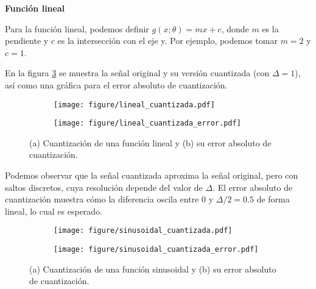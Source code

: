 \documentclass[paper=letter, fontsize=11pt, draft=false]{scrartcl}
\numberwithin{equation}{problemcounter} %
\numberwithin{figure}{problemcounter} %
\numberwithin{table}{problemcounter} %
\numberwithin{subsection}{problemcounter}
\begin{document}
\textbf{Función lineal}

Para la función lineal, podemos definir $g(x; \theta) = mx + c$, donde $m$ es la pendiente y $c$ es la intersección con el eje y. Por ejemplo, podemos tomar $m = 2$ y $c = 1$. 

En la figura \ref{fig:lineal} se muestra la señal original y su versión cuantizada (con $\Delta = 1$), así como una gráfica para el error absoluto de cuantización. 

\begin{figure}
    \centering
    \begin{subfigure}[b]{0.8\linewidth}
        \centering
        \texttt{[image: figure/lineal\_cuantizada.pdf]}
        \caption{}
        \label{fig:lineal_a}
    \end{subfigure}
    \vspace{0.5cm}
    \begin{subfigure}[b]{0.8\linewidth}
        \centering
        \texttt{[image: figure/lineal\_cuantizada\_error.pdf]}
        \caption{}
        \label{fig:lineal_b}
    \end{subfigure}
    \caption{(a) Cuantización de una función lineal y (b) su error absoluto de cuantización.}
    \label{fig:lineal}
\end{figure}

Podemos observar que la señal cuantizada aproxima la señal original, pero con saltos discretos, cuya resolución depende del valor de $\Delta$. El error absoluto de cuantización muestra cómo la diferencia oscila entre 0 y $\Delta/2 = 0.5$ de forma lineal, lo cual es esperado.


\begin{figure}
    \centering
    \begin{subfigure}[b]{0.8\linewidth}
        \centering
        \texttt{[image: figure/sinusoidal\_cuantizada.pdf]}
        \caption{}
        \label{fig:sinusoidal_a}
    \end{subfigure}
    \vspace{0.5cm}
    \begin{subfigure}[b]{0.8\linewidth}
        \centering
        \texttt{[image: figure/sinusoidal\_cuantizada\_error.pdf]}
        \caption{}
        \label{fig:sinusoidal_b}
    \end{subfigure}
    \caption{(a) Cuantización de una función sinusoidal y (b) su error absoluto de cuantización.}
    \label{fig:sinusoidal}
\end{figure}
\end{document}
